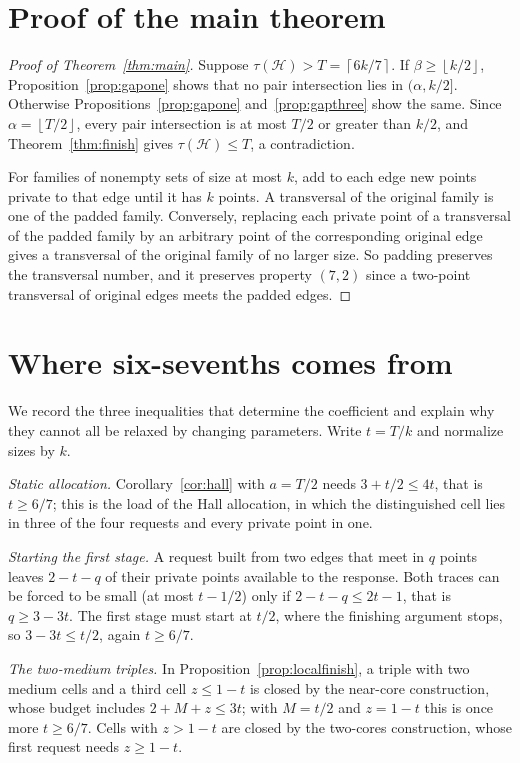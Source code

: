 \documentclass[11pt]{article}
\numberwithin{equation}{section}
\theoremstyle{definition}
\theoremstyle{remark}
\newcommand{\HH}{\mathcal H}
\newcommand{\ceil}[1]{\left\lceil #1\right\rceil}
\newcommand{\floor}[1]{\left\lfloor #1\right\rfloor}
\begin{document}
\section{Proof of the main theorem}\label{sec:proofmain}

\begin{proof}[Proof of Theorem~\ref{thm:main}]
Suppose $\tau(\HH)>T=\ceil{6k/7}$. If $\beta\ge\floor{k/2}$,
Proposition~\ref{prop:gapone} shows that no pair intersection lies in
$(\alpha,k/2]$. Otherwise Propositions~\ref{prop:gapone}
and~\ref{prop:gapthree} show the same. Since $\alpha=\floor{T/2}$, every
pair intersection is at most $T/2$ or greater than $k/2$, and
Theorem~\ref{thm:finish} gives $\tau(\HH)\le T$, a contradiction.

For families of nonempty sets of size at most $k$, add to each edge new
points private to that edge until it has $k$ points. A transversal of
the original family is one of the padded family. Conversely, replacing
each private point of a transversal of the padded family by an arbitrary
point of the corresponding original edge gives a transversal of the
original family of no larger size. So padding preserves the transversal
number, and it preserves property $(7,2)$ since a two-point transversal
of original edges meets the padded edges.
\end{proof}

\section{Where six-sevenths comes from}\label{sec:limits}

We record the three inequalities that determine the coefficient and
explain why they cannot all be relaxed by changing parameters. Write
$t=T/k$ and normalize sizes by $k$.

\emph{Static allocation.} Corollary~\ref{cor:hall} with $a=T/2$ needs
$3+t/2\le4t$, that is $t\ge6/7$; this is the load of the Hall
allocation, in which the distinguished cell lies in three of the four
requests and every private point in one.

\emph{Starting the first stage.} A request built from two edges that
meet in $q$ points leaves $2-t-q$ of their private points available to
the response. Both traces can be forced to be small (at most $t-1/2$)
only if $2-t-q\le2t-1$, that is $q\ge3-3t$. The first stage must start
at $t/2$, where the finishing argument stops, so $3-3t\le t/2$, again
$t\ge6/7$.

\emph{The two-medium triples.} In Proposition~\ref{prop:localfinish}, a
triple with two medium cells and a third cell $z\le1-t$ is closed by the
near-core construction, whose budget includes $2+M+z\le3t$; with
$M=t/2$ and $z=1-t$ this is once more $t\ge6/7$. Cells with $z>1-t$ are
closed by the two-cores construction, whose first request needs
$z\ge1-t$.
\end{document}
